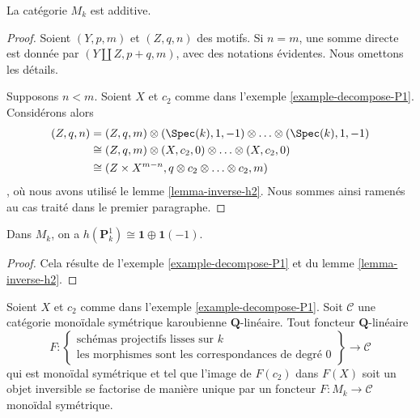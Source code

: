 \begin{lemma}
\label{lemma-additive}
La catégorie $M_k$ est additive.
\end{lemma}

\begin{proof}
Soient $(Y, p, m)$ et $(Z, q, n)$ des motifs. Si $n = m$, une
somme directe est donnée par $(Y \amalg Z, p + q, m)$, avec des notations évidentes.
Nous omettons les détails.

\medskip\noindent
Supposons $n < m$. Soient $X$ et $c_2$ comme dans
l'exemple \ref{example-decompose-P1}. Considérons alors
\begin{align*}
(Z, q, n)
& =
(Z, q, m) \otimes (\Spec(k), 1, -1) \otimes \ldots \otimes
(\Spec(k), 1, -1) \\
& \cong
(Z, q, m) \otimes (X, c_2, 0) \otimes \ldots \otimes (X, c_2, 0) \\
& \cong
(Z \times X^{m - n}, q \otimes c_2 \otimes \ldots \otimes c_2, m)
\end{align*},
où nous avons utilisé le lemme \ref{lemma-inverse-h2}.
Nous sommes ainsi ramenés au cas traité dans le premier paragraphe.
\end{proof}

\begin{lemma}
\label{lemma-decompose-P1}
Dans $M_k$, on a $h(\mathbf{P}^1_k) \cong \mathbf{1} \oplus \mathbf{1}(-1)$.
\end{lemma}

\begin{proof}
Cela résulte de l'exemple \ref{example-decompose-P1} et du
lemme \ref{lemma-inverse-h2}.
\end{proof}

\begin{lemma}
\label{lemma-characterize-motives}
Soient $X$ et $c_2$ comme dans l'exemple \ref{example-decompose-P1}.
Soit $\mathcal{C}$ une catégorie monoïdale symétrique karoubienne
$\mathbf{Q}$-linéaire. Tout foncteur $\mathbf{Q}$-linéaire
$$
F :
\left\{
\begin{matrix}
\text{schémas projectifs lisses sur }k\\
\text{les morphismes sont les correspondances de degré }0
\end{matrix}
\right\}
\longrightarrow
\mathcal{C}
$$
qui est monoïdal symétrique et tel que l'image de $F(c_2)$ dans
$F(X)$ soit un objet inversible se factorise de manière unique par un foncteur
$F : M_k \to \mathcal{C}$ monoïdal symétrique.
\end{lemma}

